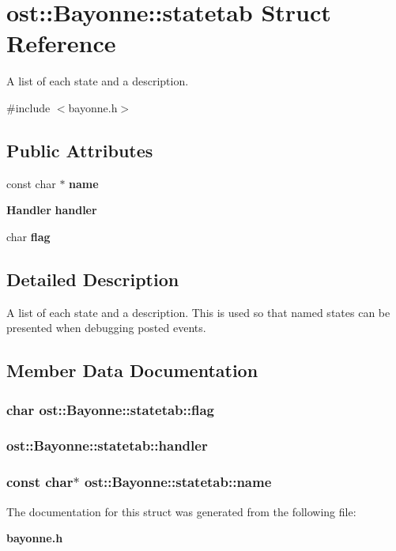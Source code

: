 \section{ost::Bayonne::statetab Struct Reference}
\label{structost_1_1_bayonne_1_1statetab}


A list of each state and a description.  


{\ttfamily \#include $<$bayonne.h$>$}\subsection*{Public Attributes}
\begin{DoxyCompactItemize}
\item 
const char $\ast$ {\bf name}
\item 
{\bf Handler} {\bf handler}
\item 
char {\bf flag}
\end{DoxyCompactItemize}


\subsection{Detailed Description}
A list of each state and a description. This is used so that named states can be presented when debugging posted events. 

\subsection{Member Data Documentation}
\subsubsection[{flag}]{\setlength{\rightskip}{0pt plus 5cm}char {\bf ost::Bayonne::statetab::flag}}\label{structost_1_1_bayonne_1_1statetab_af62eb97ee3951a2ac87aa8326d20fb28}
\subsubsection[{handler}]{ {\bf ost::Bayonne::statetab::handler}}\label{structost_1_1_bayonne_1_1statetab_a8a9c5fd73a37f5aa1909069a5a98b909}
\subsubsection[{name}]{\setlength{\rightskip}{0pt plus 5cm}const char$\ast$ {\bf ost::Bayonne::statetab::name}}\label{structost_1_1_bayonne_1_1statetab_a74ca5dd344632b21bda048ca32a79280}


The documentation for this struct was generated from the following file:\begin{DoxyCompactItemize}
\item 
{\bf bayonne.h}\end{DoxyCompactItemize}
